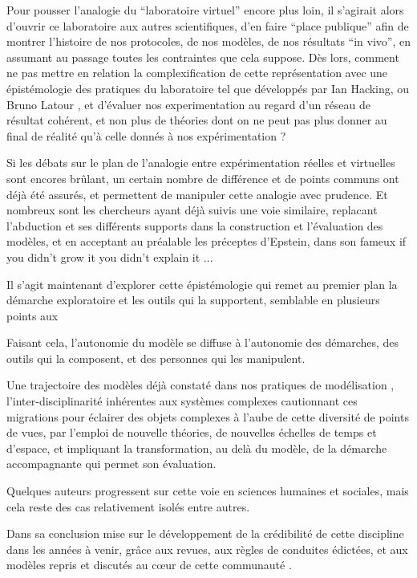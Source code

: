 Pour pousser l'analogie du \enquote{laboratoire virtuel} encore plus loin, il s'agirait alors d'ouvrir ce laboratoire aux autres scientifiques, d'en faire \enquote{place publique} afin de montrer l'histoire de nos protocoles, de nos modèles, de nos résultats \foreignquote{latin}{in vivo}, en assumant au passage toutes les contraintes que cela suppose. Dès lors, comment ne pas mettre en relation la complexification de cette représentation avec une épistémologie des pratiques du laboratoire tel que développés par Ian Hacking, ou Bruno Latour , et d'évaluer nos experimentation au regard d'un réseau de résultat cohérent, et non plus de théories dont on ne peut pas plus donner au final de réalité qu'à celle donnés à nos expérimentation ?

Si les débats sur le plan de l'analogie entre expérimentation réelles et virtuelles sont encores brûlant, un certain nombre de différence et de points communs ont déjà été assurés, et permettent de manipuler cette analogie avec prudence. Et nombreux sont les chercheurs ayant déjà suivis une voie similaire, replacant l'abduction et ses différents supports dans la construction et l'évaluation des modèles, et en acceptant au préalable les préceptes d'Epstein, dans son fameux if you didn't grow it you didn't explain it ... %

Il s'agit maintenant d'explorer cette épistémologie qui remet au premier plan la démarche exploratoire et les outils qui la supportent, semblable en plusieurs points aux

Faisant cela, l'autonomie du modèle se diffuse à l'autonomie des démarches, des outils qui la composent, et des personnes qui les manipulent.

Une trajectoire des modèles déjà constaté dans nos pratiques de modélisation \autocite{Banos2013}, l'inter-disciplinarité inhérentes aux systèmes complexes cautionnant ces migrations pour éclairer des objets complexes à l'aube de cette diversité de points de vues, par l'emploi de nouvelle théories, de nouvelles échelles de temps et d'espace, et impliquant la transformation, au delà du modèle, de la démarche accompagnante qui permet son évaluation.

Quelques auteurs progressent sur cette voie en sciences humaines et sociales, mais cela reste des cas relativement isolés \autocite{Ngo2012} \autocite{Schmitt2014} \autocite{Heppenstall2007} \autocite{Stonedahl2011a} entre autres.

Dans sa conclusion \autocite{Rouchier2013} mise sur le développement de la crédibilité de cette discipline dans les années à venir, grâce aux revues, aux règles de conduites édictées, et aux modèles repris et discutés au cœur de cette communauté \autocite{Hales2003}.

